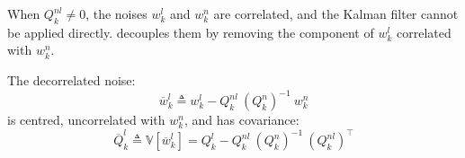 When $Q_k^{nl}\neq 0$, the noises $w_k^l$ and $w_k^n$ are correlated, and the Kalman filter cannot be applied directly.  decouples them by removing the component of $w_k^l$ correlated with $w_k^n$.

\begin{proposition}\label{th:RBPF_decorrelation}
	The decorrelated noise:
	\begin{equation}
		\overline{w}_k^l\triangleq w_k^l-Q_k^{nl}\:(Q_k^n)^{-1}\:w_k^n
	\end{equation}
	is centred, uncorrelated with $w_k^n$, and has covariance:
	\begin{equation}
		\overline{Q}_k^l\triangleq\mathbb{V}\left[\overline{w}_k^l\right]=Q_k^l-Q_k^{nl}\:(Q_k^n)^{-1}\:(Q_k^{nl})^\top
	\end{equation}
\end{proposition}


